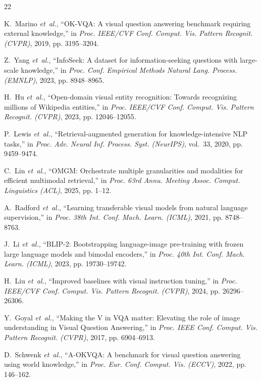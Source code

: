 \documentclass[conference]{IEEEtran}
\begin{document}
\begin{thebibliography}{22}
\footnotesize
\setlength{\itemsep}{1.2pt plus 0.5pt minus 0.5pt}

K.~Marino \textit{et~al.}, ``OK-VQA: A visual question answering benchmark requiring external knowledge,'' in \textit{Proc. IEEE/CVF Conf. Comput. Vis. Pattern Recognit. (CVPR)}, 2019, pp. 3195--3204.

Z.~Yang \textit{et~al.}, ``InfoSeek: A dataset for information-seeking questions with large-scale knowledge,'' in \textit{Proc. Conf. Empirical Methods Natural Lang. Process. (EMNLP)}, 2023, pp. 8948--8965.

H.~Hu \textit{et~al.}, ``Open-domain visual entity recognition: Towards recognizing millions of Wikipedia entities,'' in \textit{Proc. IEEE/CVF Conf. Comput. Vis. Pattern Recognit. (CVPR)}, 2023, pp. 12046--12055.

P.~Lewis \textit{et~al.}, ``Retrieval-augmented generation for knowledge-intensive NLP tasks,'' in \textit{Proc. Adv. Neural Inf. Process. Syst. (NeurIPS)}, vol.~33, 2020, pp. 9459--9474.

C.~Lin \textit{et~al.}, ``OMGM: Orchestrate multiple granularities and modalities for efficient multimodal retrieval,'' in \textit{Proc. 63rd Annu. Meeting Assoc. Comput. Linguistics (ACL)}, 2025, pp. 1--12.

A.~Radford \textit{et~al.}, ``Learning transferable visual models from natural language supervision,'' in \textit{Proc. 38th Int. Conf. Mach. Learn. (ICML)}, 2021, pp. 8748--8763.

J.~Li \textit{et~al.}, ``BLIP-2: Bootstrapping language-image pre-training with frozen large language models and bimodal encoders,'' in \textit{Proc. 40th Int. Conf. Mach. Learn. (ICML)}, 2023, pp. 19730--19742.

H.~Liu \textit{et~al.}, ``Improved baselines with visual instruction tuning,'' in \textit{Proc. IEEE/CVF Conf. Comput. Vis. Pattern Recognit. (CVPR)}, 2024, pp. 26296--26306.

Y.~Goyal \textit{et~al.}, ``Making the V in VQA matter: Elevating the role of image understanding in Visual Question Answering,'' in \textit{Proc. IEEE Conf. Comput. Vis. Pattern Recognit. (CVPR)}, 2017, pp. 6904--6913.

D.~Schwenk \textit{et~al.}, ``A-OKVQA: A benchmark for visual question answering using world knowledge,'' in \textit{Proc. Eur. Conf. Comput. Vis. (ECCV)}, 2022, pp. 146--162.


\end{thebibliography}
\end{document}
